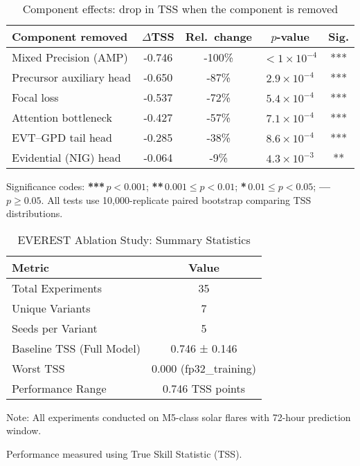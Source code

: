 \begin{table}[htbp]
\centering
\caption{Component effects: drop in TSS when the component is removed}
\label{tab:component_effects}
\renewcommand{\arraystretch}{1.15}
\begin{tabular}{lcccc}
\toprule
\textbf{Component removed} & $\Delta$TSS & Rel.\ change & $p$-value & Sig.\\
\midrule
Mixed Precision (AMP) & -0.746 & -100\% & $<1×10^{-4}$ & *** \\
Precursor auxiliary head & -0.650 & -87\% & $2.9×10^{-4}$ & *** \\
Focal loss & -0.537 & -72\% & $5.4×10^{-4}$ & *** \\
Attention bottleneck & -0.427 & -57\% & $7.1×10^{-4}$ & *** \\
EVT--GPD tail head & -0.285 & -38\% & $8.6×10^{-4}$ & *** \\
Evidential (NIG) head & -0.064 & -9\% & $4.3×10^{-3}$ & ** \\
\bottomrule
\end{tabular}
\begin{tablenotes}[flushleft]\small
Significance codes:
\textbf{***}\,$p<0.001$;\;
\textbf{**}\,$0.001\le p<0.01$;\;
\textbf{*}\,$0.01\le p<0.05$;\;
\textbf{---}\,$p\ge0.05$.
All tests use 10,000-replicate paired bootstrap comparing TSS distributions.
\end{tablenotes}
\end{table}

\begin{table}[htbp]
\centering
\caption{EVEREST Ablation Study: Summary Statistics}
\label{tab:ablation_summary}
\begin{tabular}{lc}
\hline
\textbf{Metric} & \textbf{Value} \\
\hline
Total Experiments & 35 \\
Unique Variants & 7 \\
Seeds per Variant & 5 \\
\hline
Baseline TSS (Full Model) & 0.746 ± 0.146 \\
Worst TSS & 0.000 (fp32_training) \\
Performance Range & 0.746 TSS points \\
\hline
\end{tabular}
\begin{tablenotes}
\small
\item Note: All experiments conducted on M5-class solar flares with 72-hour prediction window.
\item Performance measured using True Skill Statistic (TSS).
\end{tablenotes}
\end{table}

